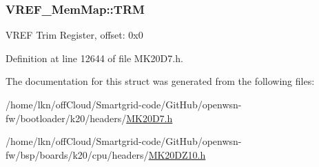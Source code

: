 \subsubsection[{\texorpdfstring{T\+RM}{TRM}}]{ V\+R\+E\+F\+\_\+\+Mem\+Map\+::\+T\+RM}\hypertarget{struct_v_r_e_f___mem_map_a987ecd280eb0b25ff58841b304de2e1f}{}\label{struct_v_r_e_f___mem_map_a987ecd280eb0b25ff58841b304de2e1f}
V\+R\+EF Trim Register, offset\+: 0x0 

Definition at line 12644 of file M\+K20\+D7.\+h.



The documentation for this struct was generated from the following files\+:\begin{DoxyCompactItemize}
\item 
/home/lkn/off\+Cloud/\+Smartgrid-\/code/\+Git\+Hub/openwsn-\/fw/bootloader/k20/headers/\hyperlink{bootloader_2k20_2headers_2_m_k20_d7_8h}{M\+K20\+D7.\+h}\item 
/home/lkn/off\+Cloud/\+Smartgrid-\/code/\+Git\+Hub/openwsn-\/fw/bsp/boards/k20/cpu/headers/\hyperlink{_m_k20_d_z10_8h}{M\+K20\+D\+Z10.\+h}\end{DoxyCompactItemize}
